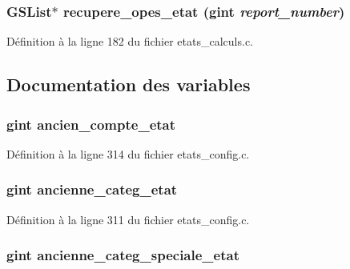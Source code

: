\subsubsection[{recupere\_\-opes\_\-etat}]{\setlength{\rightskip}{0pt plus 5cm}GSList$\ast$ recupere\_\-opes\_\-etat (gint {\em report\_\-number})}\label{etats__calculs_8c_afbec2d5bda4c558e44362eeaa0ed847e}


Définition à la ligne 182 du fichier etats\_\-calculs.c.



\subsection{Documentation des variables}
\subsubsection[{ancien\_\-compte\_\-etat}]{\setlength{\rightskip}{0pt plus 5cm}gint {\bf ancien\_\-compte\_\-etat}}\label{etats__calculs_8c_aa963ebc8f70f33f5f763428e5b60223d}


Définition à la ligne 314 du fichier etats\_\-config.c.

\subsubsection[{ancienne\_\-categ\_\-etat}]{\setlength{\rightskip}{0pt plus 5cm}gint {\bf ancienne\_\-categ\_\-etat}}\label{etats__calculs_8c_a27ae89b8d957ad090d865123d0140660}


Définition à la ligne 311 du fichier etats\_\-config.c.

\subsubsection[{ancienne\_\-categ\_\-speciale\_\-etat}]{\setlength{\rightskip}{0pt plus 5cm}gint {\bf ancienne\_\-categ\_\-speciale\_\-etat}}\label{etats__calculs_8c_a272b0e6e10dda1b35e50300cd610cfd1}


